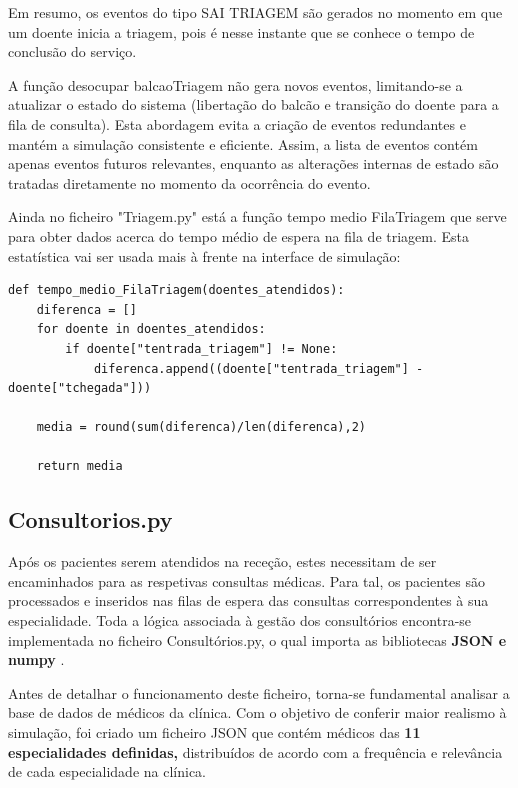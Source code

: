 \documentclass[12pt,a4paper]{article} %
\begin{document}
    Em resumo, os eventos do tipo SAI TRIAGEM são gerados no momento em que um doente inicia a triagem, pois é nesse instante que se conhece o tempo de conclusão do serviço.
    
    A função desocupar balcaoTriagem não gera novos eventos, limitando-se a atualizar o estado do sistema (libertação do balcão e transição do doente para a fila de consulta). Esta abordagem evita a criação de eventos redundantes e mantém a simulação consistente e eficiente. Assim, a lista de eventos contém apenas eventos futuros relevantes, enquanto as alterações internas de estado são tratadas diretamente no momento da ocorrência do evento.
    
    \medskip
    Ainda no ficheiro "Triagem.py" está a função tempo medio FilaTriagem que serve para obter dados acerca do tempo médio de espera na fila de triagem. Esta estatística vai ser usada mais à frente na interface de simulação:

\begin{verbatim}
def tempo_medio_FilaTriagem(doentes_atendidos):
    diferenca = []
    for doente in doentes_atendidos:
        if doente["tentrada_triagem"] != None:
            diferenca.append((doente["tentrada_triagem"] - doente["tchegada"]))

    media = round(sum(diferenca)/len(diferenca),2)

    return media
\end{verbatim}

    \medskip
    \subsection{Consultorios.py}

    Após os pacientes serem atendidos na receção, estes necessitam de ser encaminhados para as respetivas consultas médicas. Para tal, os pacientes são processados e inseridos nas filas de espera das consultas correspondentes à sua especialidade. Toda a lógica associada à gestão dos consultórios encontra-se implementada no ficheiro Consultórios.py, o qual importa as bibliotecas \textbf{JSON e numpy} .

    Antes de detalhar o funcionamento deste ficheiro, torna-se fundamental analisar a base de dados de médicos da clínica. Com o objetivo de conferir maior realismo à simulação, foi criado um ficheiro JSON que contém médicos das \textbf{11 especialidades definidas,} distribuídos de acordo com a frequência e relevância de cada especialidade na clínica.
\end{document}

